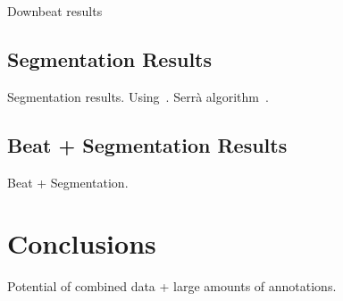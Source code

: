 \documentclass{article}
\begin{document}
Downbeat results

\subsection{Segmentation Results}

Segmentation results. Using~\cite{Nieto2016}. Serr\`a algorithm~\cite{Serra2014}.

\subsection{Beat + Segmentation Results}

Beat + Segmentation.

\section{Conclusions}\label{sec:conclusions}

Potential of combined data + large amounts of annotations.


\end{document}
